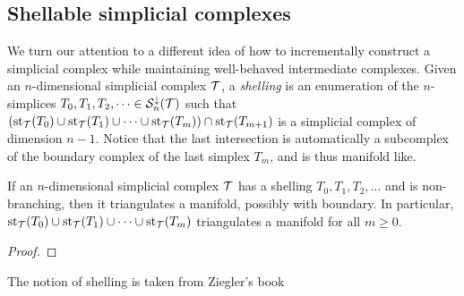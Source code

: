 \documentclass[a4paper]{amsart}
\begin{document}





\subsection{Shellable simplicial complexes}

We turn our attention to a different idea of how to incrementally construct a simplicial complex while maintaining well-behaved intermediate complexes. 
Given an $n$-dimensional simplicial complex ${\mathcal T}$, a \emph{shelling} is an enumeration of the $n$-simplices $T_{0}, T_{1}, T_{2}, \dots \in {\mathcal S}^{\downarrow}_{n}({\mathcal T})$ such that $( \operatorname{st}_{{\mathcal T}}(T_{0}) \cup \operatorname{st}_{{\mathcal T}}(T_{1}) \cup \dots \cup \operatorname{st}_{{\mathcal T}}(T_{m}) ) \cap \operatorname{st}_{{\mathcal T}}(T_{m+1})$ is a simplicial complex of dimension $n-1$. Notice that the last intersection is automatically a subcomplex of the boundary complex of the last simplex $T_{m}$, and is thus manifold like. 


\begin{lemma}
    If an $n$-dimensional simplicial complex ${\mathcal T}$ has a shelling $T_{0}, T_{1}, T_{2}, \dots$ and is non-branching, then it triangulates a manifold, possibly with boundary.
    In particular, $\operatorname{st}_{{\mathcal T}}(T_{0}) \cup \operatorname{st}_{{\mathcal T}}(T_{1}) \cup \dots \cup \operatorname{st}_{{\mathcal T}}(T_{m})$ triangulates a manifold for all $m \geq 0$.
\end{lemma}
\begin{proof}    
\end{proof}

The notion of shelling is taken from Ziegler's book~\cite{ziegler2012lectures}


% 
\end{document}
